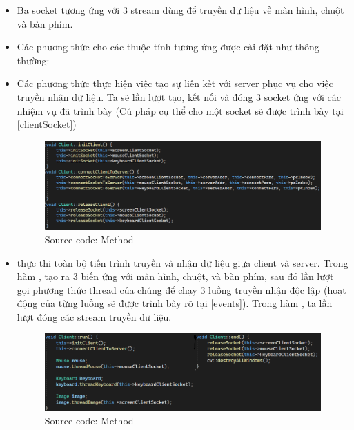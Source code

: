 \begin{itemize}
        \item Ba socket tương ứng với 3 stream dùng để truyền dữ liệu về màn hình, chuột và bàn phím.
        \item  Các phương thức \textbf{} cho các thuộc tính tương ứng được cài đặt như thông thường:
        \item Các phương thức \textbf{} thực hiện việc tạo sự liên kết với server phục vụ cho việc truyền nhận dữ liệu. Ta sẽ lần lượt tạo, kết nối và đóng 3 socket ứng với các nhiệm vụ đã trình bày (Cú pháp cụ thể cho một socket sẽ được trình bày tại \ref{clientSocket})
         \begin{figure}[H]
	\begin{center}
		\includegraphics[scale=0.7]{img/clientConnect}
     \caption{Source code: Method \textbf{}}
	\end{center}
		
    \end{figure}
        \item \textbf{} thực thi toàn bộ tiến trình truyền và nhận dữ liệu giữa client và server. Trong hàm \textbf{}, tạo ra 3 biến ứng với màn hình, chuột, và bàn phím, sau đó lần lượt gọi phương thức thread của chúng để chạy 3 luồng truyền nhận độc lập (hoạt động của từng luồng sẽ được trình bày rõ tại \ref{events}). Trong hàm \textbf{}, ta lần lượt đóng các stream truyền dữ liệu.
         \begin{figure}[H]
	\begin{center}
		\includegraphics[scale=0.75]{img/clientRunEnd}
    \caption{Source code: Method \textbf{}}
	\end{center}
		
    \end{figure}
\end{itemize}







